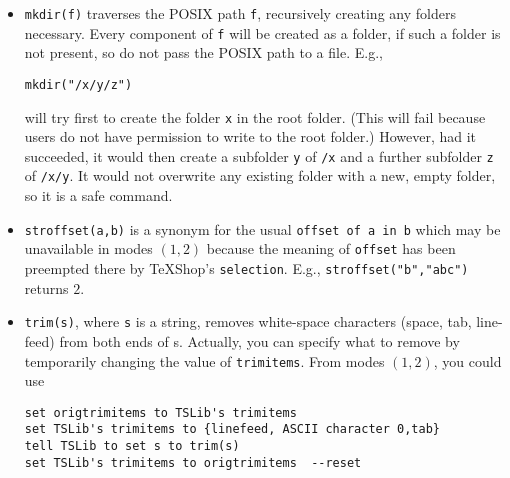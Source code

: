 \documentclass[11pt]{amsart}
\begin{document}
\begin{itemize}
\begin{verbatim}
{"/Users/Al/Documents","eg","eg.tex"}
\end{verbatim}
 if the file had not been saved with extension hidden, and otherwise it would return \begin{verbatim}
{"/Users/Al/Documents","eg","eg"}
\end{verbatim}
 This gives you an easy way to construct the equivalents of 
\verb|#..#| items when you open a new {\tt.tex} file in a script. E.g., having specified an existing tex file with POSIX path string s,
\begin{verbatim}
tell TSLib to set {pdir, shortname, displayname} to docname(s)
set dviname to pdir & "/" & shortname & ".dvi"
\end{verbatim}
\item {\tt mkdir(f)} traverses the POSIX path {\tt f}, recursively creating any folders necessary. Every component of {\tt f} will be created as a folder, if such a folder is not present, so do not pass the POSIX path to a file. E.g.,
\begin{verbatim}
mkdir("/x/y/z")
\end{verbatim}
will try first to create the folder \verb|x| in the root folder. (This will fail because users do not have permission to write to the root folder.) However, had it succeeded, it would then create a subfolder {\tt y} of \verb|/x| and a further subfolder {\tt z} of \verb|/x/y|. It would not overwrite any existing folder with a new, empty folder, so it is a safe command.
\item {\tt stroffset(a,b)} is a synonym for the usual {\tt offset of a in b} which may be unavailable in modes $(1,2)$ because the meaning of {\tt offset} has been preempted there by TeXShop's {\tt selection}. E.g., {\tt stroffset("b","abc")} returns $2$.
\item {\tt trim(s)}, where {\tt s} is a string, removes white-space characters (space, tab, line-feed) from both ends of s. Actually, you can specify what to remove by temporarily changing the value of {\tt trimitems}. From modes $(1,2)$, you could use
\begin{verbatim}
set origtrimitems to TSLib's trimitems
set TSLib's trimitems to {linefeed, ASCII character 0,tab}
tell TSLib to set s to trim(s)
set TSLib's trimitems to origtrimitems  --reset
\end{verbatim}
\end{itemize}
\end{document}
